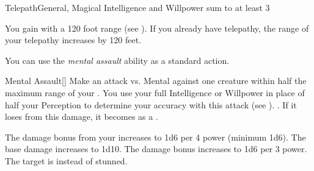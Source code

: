     \begin{magicalfeat}{Telepath}{General, Magical}
        \featpre Intelligence and Willpower sum to at least 3

         You gain  with a 120 foot range (see ).
        If you already have telepathy, the range of your telepathy increases by 120 feet.

         You can use the \textit{mental assault} ability as a standard action.
        \begin{magicalactiveability}{Mental Assault}[]
            \rankline
            Make an attack vs. Mental against one creature within half the maximum range of your .
            You use your full Intelligence or Willpower in place of half your Perception to determine your accuracy with this attack (see ).
            \hit {}.
            If it loses  from this damage, it becomes \stunned as a .

            \rankline
             The damage bonus from your  increases to 1d6 per 4 power (minimum 1d6).
             The base damage increases to 1d10.
             The damage bonus increases to 1d6 per 3 power.
             The target is \confused instead of stunned.
        \end{magicalactiveability}


\end{magicalfeat}
